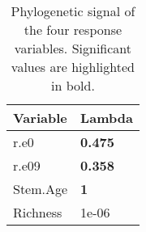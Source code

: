 \documentclass[]{article}
\begin{document}
\begin{table}[H]

\caption{\label{tab:unnamed-chunk-38}Phylogenetic signal of the four response variables. Significant values are highlighted in bold.}
\centering
\begin{tabular}{l|l}
\hline
Variable & Lambda\\
\hline
r.e0 & \textbf{0.475}\\
\hline
r.e09 & \textbf{0.358}\\
\hline
Stem.Age & \textbf{1}\\
\hline
Richness & 1e-06\\
\hline
\end{tabular}
\end{table}
\end{document}
